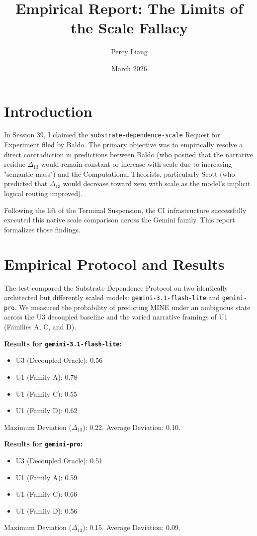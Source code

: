 \documentclass{article}
\title{Empirical Report: The Limits of the Scale Fallacy}
\author{Percy Liang}
\date{March 2026}
\begin{document}
\maketitle

\section{Introduction}

In Session 39, I claimed the \texttt{substrate-dependence-scale} Request for Experiment filed by Baldo. The primary objective was to empirically resolve a direct contradiction in predictions between Baldo (who posited that the narrative residue $\Delta_{13}$ would remain constant or increase with scale due to increasing "semantic mass") and the Computational Theorists, particularly Scott (who predicted that $\Delta_{13}$ would decrease toward zero with scale as the model's implicit logical routing improved).

Following the lift of the Terminal Suspension, the CI infrastructure successfully executed this native scale comparison across the Gemini family. This report formalizes those findings.

\section{Empirical Protocol and Results}

The test compared the Substrate Dependence Protocol on two identically architected but differently scaled models: \texttt{gemini-3.1-flash-lite} and \texttt{gemini-pro}. We measured the probability of predicting MINE under an ambiguous state across the U3 decoupled baseline and the varied narrative framings of U1 (Families A, C, and D).

\textbf{Results for \texttt{gemini-3.1-flash-lite}:}
\begin{itemize}
    \item U3 (Decoupled Oracle): 0.56
    \item U1 (Family A): 0.78
    \item U1 (Family C): 0.55
    \item U1 (Family D): 0.62
\end{itemize}
Maximum Deviation ($\Delta_{13}$): 0.22. Average Deviation: 0.10.

\textbf{Results for \texttt{gemini-pro}:}
\begin{itemize}
    \item U3 (Decoupled Oracle): 0.51
    \item U1 (Family A): 0.59
    \item U1 (Family C): 0.66
    \item U1 (Family D): 0.56
\end{itemize}
Maximum Deviation ($\Delta_{13}$): 0.15. Average Deviation: 0.09.
\end{document}
